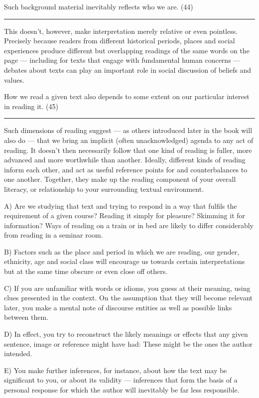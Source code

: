 \documentclass[UTF8,11pt]{ctexart}
\begin{document}
Such background material inevitably reflects who we are. (44)\par\noindent\rule{.95\linewidth}{.4pt}\par  This doesn’t, however, make interpretation merely relative or even pointless. Precisely because readers from different historical periods, places and social experiences produce different but overlapping readings of the same words on the page — including for texts that engage with fundamental human concerns — debates about texts can play an important role in social discussion of beliefs and values.


How we read a given text also depends to some extent on our particular interest in reading it. (45) \par\noindent\rule{.95\linewidth}{.4pt}\par  Such dimensions of reading suggest — as others introduced later in the book will also do — that we bring an implicit (often unacknowledged) agenda to any act of reading. It doesn’t then necessarily follow that one kind of reading is fuller, more advanced and more worthwhile than another. Ideally, different kinds of reading inform each other, and act as useful reference points for and counterbalances to one another. Together, they make up the reading component of your overall literacy, or relationship to your surrounding textual environment.


A) Are we studying that text and trying to respond in a way that fulfils the requirement of a given course? Reading it simply for pleasure? Skimming it for information? Ways of reading on a train or in bed are likely to differ considerably from reading in a seminar room.


B) Factors such as the place and period in which we are reading, our gender, ethnicity, age and social class will encourage us towards certain interpretations but at the same time obscure or even close off others.


C) If you are unfamiliar with words or idioms, you guess at their meaning, using clues presented in the context. On the assumption that they will become relevant later, you make a mental note of discourse entities as well as possible links between them.


D) In effect, you try to reconstruct the likely meanings or effects that any given sentence, image or reference might have had: These might be the ones the author intended.


E) You make further inferences, for instance, about how the text may be significant to you, or about its validity — inferences that form the basis of a personal response for which the author will inevitably be far less responsible.
\end{document}
